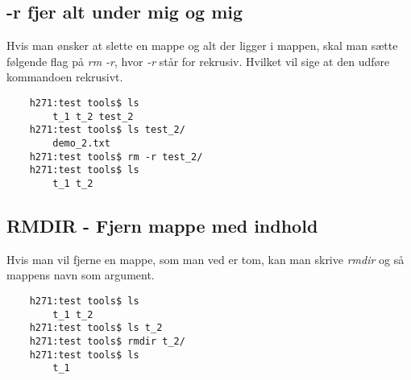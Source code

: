 \subsection*{-r fjer alt under mig og mig}
Hvis man ønsker at slette en mappe og alt der ligger i mappen, skal man sætte følgende flag på \textit{rm -r}, hvor \textit{-r} står for rekrusiv. Hvilket vil sige at den udføre kommandoen rekrusivt.
\begin{lstlisting}
	h271:test tools$ ls
        t_1	t_2	test_2
	h271:test tools$ ls test_2/
        demo_2.txt
	h271:test tools$ rm -r test_2/
	h271:test tools$ ls
        t_1	t_2
\end{lstlisting}
\subsection*{RMDIR - Fjern mappe med indhold}
Hvis man vil fjerne en mappe, som man ved er tom, kan man skrive \textit{rmdir} og så mappens navn som argument.
\begin{lstlisting}
	h271:test tools$ ls
        t_1	t_2
	h271:test tools$ ls t_2
	h271:test tools$ rmdir t_2/
	h271:test tools$ ls
        t_1
\end{lstlisting}
